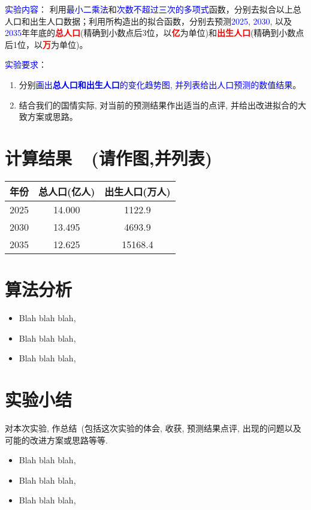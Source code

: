 \documentclass[UTF8]{ctexart}
\begin{document}
\textcolor{blue}{实验内容}：
利用\textcolor{blue}{最小二乘法}和\textcolor{blue}{次数不超过三次的多项式}函数，分别去拟合以上{\color{blue}总人口和出生人口数据}；利用所构造出的拟合函数，分别去预测\textcolor{blue}{2025}, \textcolor{blue}{2030}, 以及\textcolor{blue}{2035}年年底的\textcolor{red}{\textbf{总人口}}(精确到小数点后3位，以\textcolor{red}{\textbf{亿}}为单位)和\textcolor{red}{\textbf{出生人口}}(精确到小数点后1位，以\textcolor{red}{\textbf{万}}为单位)。

\vspace{0.5cm}\textcolor{blue}{实验要求}：

\begin{enumerate}
    \item 分别\textcolor{blue}{画出\textbf{总人口和出生人口}的变化趋势图, 并列表给出人口预测的数值结果}。
    \item 结合我们的国情实际, 对当前的预测结果作出适当的点评, 并给出改进拟合的大致方案或思路。
\end{enumerate}

\newpage
\section{计算结果~~(请作图,并列表)}


\begin{table}[h]
    \centering
    \begin{tabular}{|c|c|c|}
        \hline
        \textbf{年份} & \textbf{总人口(亿人)} & \textbf{出生人口(万人)} \\
        \hline
        2025 & 14.000 & 1122.9 \\
        \hline
        2030 & 13.495 & 4693.9 \\
        \hline
        2035 & 12.625 & 15168.4 \\
        \hline
    \end{tabular}
\end{table}
\section{算法分析}

    \begin{itemize}
        \item Blah blah blah,

        \item Blah blah blah,

        \item Blah blah blah,
    \end{itemize}

\section{实验小结}
{\color{blue}对本次实验, 作总结~(包括这次实验的体会, 收获, 预测结果点评, 出现的问题以及可能的改进方案或思路等等}.
\begin{itemize}
    \item Blah blah blah,
    \item Blah blah blah,
    \item Blah blah blah,

\end{itemize}
\end{document}
